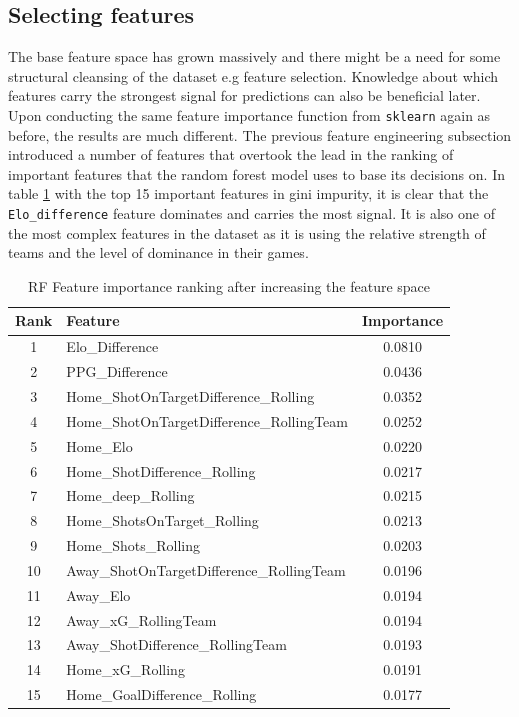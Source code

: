 \documentclass{article}
\begin{document}
\subsection{Selecting features}
The base feature space has grown massively and there might be a need for some structural cleansing of the dataset e.g feature selection. Knowledge about which features carry the strongest signal for predictions can also be beneficial later. Upon conducting the same feature importance function from \texttt{sklearn} again as before, the results are much different. The previous feature engineering subsection introduced a number of features that overtook the lead in the ranking of important features that the random forest model uses to base its decisions on. In table \ref{tab:feature_importance_v2} with the top 15 important features in gini impurity, it is clear that the \texttt{Elo\_difference} feature dominates and carries the most signal. It is also one of the most complex features in the dataset as it is using the relative strength of teams and the level of dominance in their games.
\begin{table}[H]
\centering
\begin{tabular}{@{} c l c @{}}
\toprule
\textbf{Rank} & \textbf{Feature} & \textbf{Importance} \\
\midrule
1  & Elo\_Difference                              & 0.0810 \\
2  & PPG\_Difference                               & 0.0436 \\
3  & Home\_ShotOnTargetDifference\_Rolling        & 0.0352 \\
4  & Home\_ShotOnTargetDifference\_RollingTeam    & 0.0252 \\
5  & Home\_Elo                                     & 0.0220 \\
6  & Home\_ShotDifference\_Rolling                & 0.0217 \\
7  & Home\_deep\_Rolling                          & 0.0215 \\
8  & Home\_ShotsOnTarget\_Rolling                 & 0.0213 \\
9  & Home\_Shots\_Rolling                         & 0.0203 \\
10 & Away\_ShotOnTargetDifference\_RollingTeam    & 0.0196 \\
11 & Away\_Elo                                     & 0.0194 \\
12 & Away\_xG\_RollingTeam                        & 0.0194 \\
13 & Away\_ShotDifference\_RollingTeam            & 0.0193 \\
14 & Home\_xG\_Rolling                           & 0.0191 \\
15 & Home\_GoalDifference\_Rolling                & 0.0177 \\
\bottomrule
\end{tabular}
\caption{RF Feature importance ranking after increasing the feature space}
\label{tab:feature_importance_v2}
\end{table}
\end{document}
